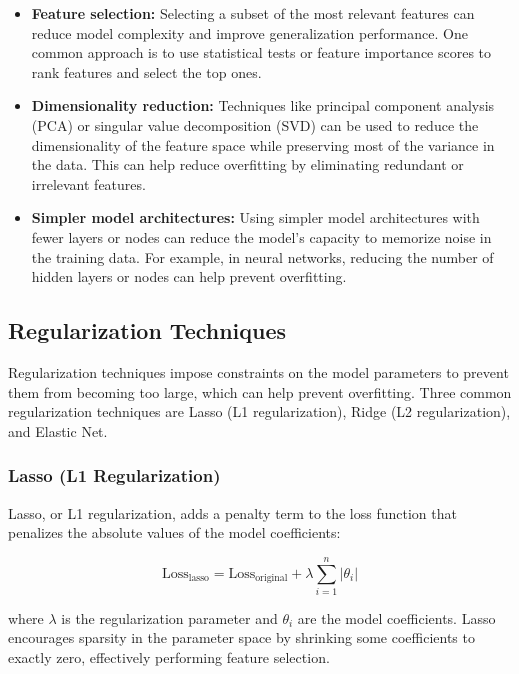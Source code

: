 \documentclass[12pt]{book} %
\begin{document}
\begin{itemize}
    \item \textbf{Feature selection:} Selecting a subset of the most relevant features can reduce model complexity and improve generalization performance. One common approach is to use statistical tests or feature importance scores to rank features and select the top ones.
    
    \item \textbf{Dimensionality reduction:} Techniques like principal component analysis (PCA) or singular value decomposition (SVD) can be used to reduce the dimensionality of the feature space while preserving most of the variance in the data. This can help reduce overfitting by eliminating redundant or irrelevant features.
    
    \item \textbf{Simpler model architectures:} Using simpler model architectures with fewer layers or nodes can reduce the model's capacity to memorize noise in the training data. For example, in neural networks, reducing the number of hidden layers or nodes can help prevent overfitting.
\end{itemize}

\subsection{Regularization Techniques}

Regularization techniques impose constraints on the model parameters to prevent them from becoming too large, which can help prevent overfitting. Three common regularization techniques are Lasso (L1 regularization), Ridge (L2 regularization), and Elastic Net.

\subsubsection{Lasso (L1 Regularization)}

Lasso, or L1 regularization, adds a penalty term to the loss function that penalizes the absolute values of the model coefficients:

\[
\text{Loss}_{\text{lasso}} = \text{Loss}_{\text{original}} + \lambda \sum_{i=1}^{n} |\theta_i|
\]

where \( \lambda \) is the regularization parameter and \( \theta_i \) are the model coefficients. Lasso encourages sparsity in the parameter space by shrinking some coefficients to exactly zero, effectively performing feature selection.
\end{document}
